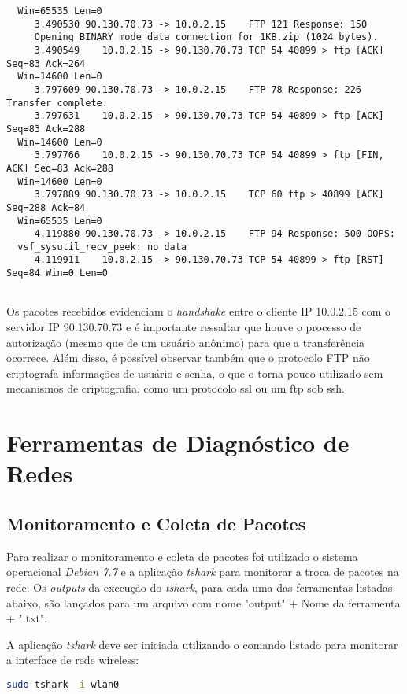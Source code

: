 \documentclass[a4paper]{report} %
\begin{document}
\begin{lstlisting}
  Win=65535 Len=0
     3.490530 90.130.70.73 -> 10.0.2.15    FTP 121 Response: 150 
     Opening BINARY mode data connection for 1KB.zip (1024 bytes).
     3.490549    10.0.2.15 -> 90.130.70.73 TCP 54 40899 > ftp [ACK] Seq=83 Ack=264 
  Win=14600 Len=0
     3.797609 90.130.70.73 -> 10.0.2.15    FTP 78 Response: 226 Transfer complete.
     3.797631    10.0.2.15 -> 90.130.70.73 TCP 54 40899 > ftp [ACK] Seq=83 Ack=288 
  Win=14600 Len=0
     3.797766    10.0.2.15 -> 90.130.70.73 TCP 54 40899 > ftp [FIN, ACK] Seq=83 Ack=288 
  Win=14600 Len=0
     3.797889 90.130.70.73 -> 10.0.2.15    TCP 60 ftp > 40899 [ACK] Seq=288 Ack=84 
  Win=65535 Len=0
     4.119880 90.130.70.73 -> 10.0.2.15    FTP 94 Response: 500 OOPS: 
  vsf_sysutil_recv_peek: no data
     4.119911    10.0.2.15 -> 90.130.70.73 TCP 54 40899 > ftp [RST] Seq=84 Win=0 Len=0
	
\end{lstlisting}	

	Os pacotes recebidos evidenciam o \textit{handshake} entre o cliente IP 10.0.2.15 com o servidor IP 90.130.70.73 e é importante ressaltar que houve o processo de autorização (mesmo que de um usuário anônimo) para que a transferência ocorrece. Além disso, é possível observar também que o protocolo FTP não criptografa informações de usuário e senha, o que o torna pouco utilizado sem mecanismos de criptografia, como um protocolo ssl ou um ftp sob ssh. 

\chapter{Ferramentas de Diagnóstico de Redes}
\label{chap_segundo}

\section{Monitoramento e Coleta de Pacotes}
\label{sec_segundo_monitoramento}

Para realizar o monitoramento e coleta de pacotes foi utilizado o sistema operacional \textit{Debian 7.7} e a aplicação \textit{tshark} para monitorar a troca de pacotes na rede.
Os \textit{outputs} da execução do \textit{tshark}, para cada uma das ferramentas listadas abaixo, são lançados para um arquivo com nome "output" + Nome da ferramenta + ".txt".

	A aplicação \textit{tshark} deve ser iniciada utilizando o comando listado para monitorar a interface de rede wireless:
\begin{lstlisting}[language=bash]
	sudo tshark -i wlan0
\end{lstlisting}
\end{document}
